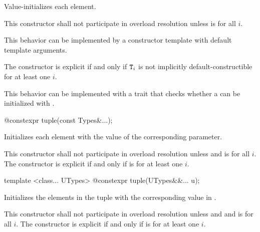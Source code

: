 \begin{itemdescr}
\pnum
\effects Value-initializes each element.

\pnum
\remarks
This constructor shall not participate in overload resolution unless
 is  for all $i$.
\begin{note} This behavior can be implemented by a constructor template
with default template arguments. \end{note}
The constructor is explicit if and only if $\texttt{T}_i$ is not implicitly
default-constructible for at least one $i$.
\begin{note} This behavior can be implemented with a trait that checks whether
a  can be initialized with \tcode{\{\}}. \end{note}
\end{itemdescr}

%
\begin{itemdecl}
@\EXPLICIT@ constexpr tuple(const Types&...);
\end{itemdecl}

\begin{itemdescr}
\pnum
\effects Initializes each element with the value of the
corresponding parameter.

\pnum
\remarks This constructor shall not participate in overload resolution unless
 and 
is  for all $i$. The constructor is explicit if and only if
 is 
for at least one $i$.
\end{itemdescr}

%
\begin{itemdecl}
template <class... UTypes> @\EXPLICIT@ constexpr tuple(UTypes&&... u);
\end{itemdecl}

\begin{itemdescr}
\pnum
\effects Initializes the elements in the tuple with the
corresponding value in .

\pnum
\remarks This constructor shall not participate in overload resolution unless
 \tcode{==}  and
 and 
is  for all $i$. The constructor is explicit if and only if
 is 
for at least one $i$.
\end{itemdescr}

